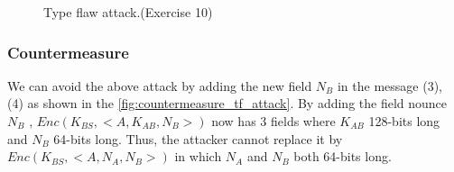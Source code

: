 \begin{figure}
\begin{tikzpicture}[x=0.6pt,y=0.75pt,yscale=-1,xscale=0.8]
    \end{tikzpicture}

    \caption{Type flaw attack.(Exercise 10)}\label{fig:type_flaw_attack}

\end{figure}


\subsubsection*{Countermeasure}
We can avoid the above attack by adding the new field \(N_B\) in the message (3), (4)
as shown in the \autoref{fig:countermeasure_tf_attack}. By adding the field nounce \(N_B\)
, \(Enc(K_{BS},<A,K_{AB},N_B>)\) now has 3 fields where \(K_{AB}\) 128-bits long and \(
N_B\) 64-bits long. Thus, the attacker cannot replace it by \(Enc(K_{BS},<A,N_A,N_B>)\)
in which \(N_A\) and \(N_B\) both 64-bits long.

